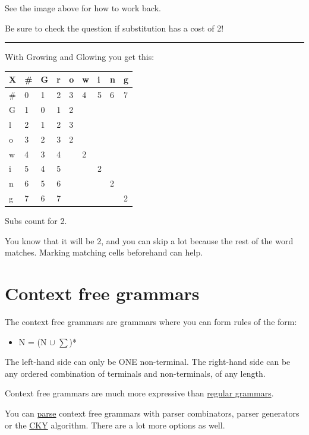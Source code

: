 \documentclass[
  11pt,
  british,
]{article}
\providecommand{\tightlist}{%
  \setlength{\itemsep}{0pt}\setlength{\parskip}{0pt}}
\begin{document}
See the image above for how to work back.

Be sure to check the question if substitution has a cost of 2!

\begin{center}\rule{0.5\linewidth}{0.5pt}\end{center}

With Growing and Glowing you get this:

\begin{longtable}[]{@{}lllllllll@{}}
\toprule
X & \# & G & r & o & w & i & n & g \\
\midrule
\endhead
\# & 0 & 1 & 2 & 3 & 4 & 5 & 6 & 7 \\
G & 1 & 0 & 1 & 2 & & & & \\
l & 2 & 1 & 2 & 3 & & & & \\
o & 3 & 2 & 3 & 2 & & & & \\
w & 4 & 3 & 4 & & 2 & & & \\
i & 5 & 4 & 5 & & & 2 & & \\
n & 6 & 5 & 6 & & & & 2 & \\
g & 7 & 6 & 7 & & & & & 2 \\
\bottomrule
\end{longtable}

Subs count for 2.

You know that it will be 2, and you can skip a lot because the rest of
the word matches. Marking matching cells beforehand can help.

\hypertarget{context-free-grammars}{%
\section{Context free grammars}\label{context-free-grammars}}

The context free grammars are grammars where you can form rules of the
form:

\begin{itemize}
\tightlist
\item
  N = (N \(\cup\) \(\sum\))*
\end{itemize}

The left-hand side can only be ONE non-terminal. The right-hand side can
be any ordered combination of terminals and non-terminals, of any
length.

Context free grammars are much more expressive than
\href{Regular\%20Languages.md}{regular grammars}.

You can \href{Parsing.md}{parse} context free grammars with parser
combinators, parser generators or the \href{CKY.md}{CKY} algorithm.
There are a lot more options as well.
\end{document}
